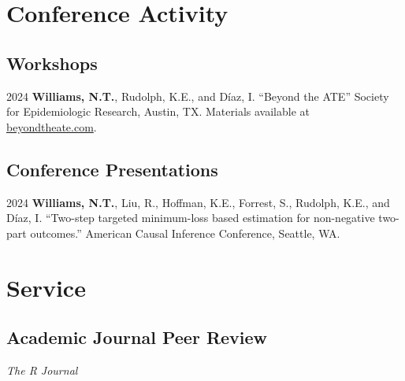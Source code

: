 \documentclass[12pt,letterpaper]{report}
\newcommand{\listitemspace}{0.15em}
\renewenvironment{itemize}
{\begin{list}{}{\setlength{\leftmargin}{0em}
            \setlength{\parskip}{0em}
            \setlength{\itemsep}{\listitemspace}
            \setlength{\parsep}{\listitemspace}}}
    {\end{list}}
\begin{document}
    \section*{Conference Activity}
    
    \subsection*{Workshops}
    
    \begin{tablist}
        
    \item[2024] \tab \textbf{Williams, N.T.}, Rudolph, K.E., and Díaz, I. \enquote{Beyond the ATE} Society for Epidemiologic Research, Austin, TX. Materials available at \href{https://beyondtheate.com/}{beyondtheate.com}.
    
    \end{tablist}

    \subsection*{Conference Presentations}

    \begin{tablist}
    
    \item[2024] \tab \textbf{Williams, N.T.}, Liu, R., Hoffman, K.E., Forrest, S., Rudolph, K.E., and Díaz, I. \enquote{Two-step targeted minimum-loss based estimation for non-negative two-part outcomes.} American Causal Inference Conference, Seattle, WA.

    \end{tablist}
    
    \section*{Service}
    
    \subsection*{Academic Journal Peer Review}
    
    \begin{itemize}
    
    	\item \textit{The R Journal}
    
    \end{itemize}
\end{document}
